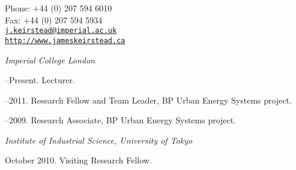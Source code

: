 \documentclass[11pt,a4paper]{article}
\makeatletter
\def\myemail{j.keirstead@imperial.ac.uk}
\def\myweb{http://www.jameskeirstead.ca}
\def\myphone{+44 (0) 207 594 6010}
\def\myfax{+44 (0) 207 594 5934}
\makeatother
\begin{document}
\begin{minipage}[t]{2.95in}
\end{minipage}
\hfill     
\hfill
\begin{minipage}[t]{1.7in}
  \flushright \footnotesize Phone: \myphone \\ 
  Fax: \myfax  \\ 
  {\scriptsize  \texttt{\href{mailto:\myemail}{\myemail}}} \\
  {\scriptsize  \texttt{\href{\myweb}{\myweb}}}
\end{minipage}


\bigskip

\bigskip

\reversemarginpar
\raggedright

\bigskip

\bigskip


\noindent{}%
%
\emph{Imperial College London \vspace{0.01in}}

--Present. Lecturer.      

--2011. Research Fellow and Team Leader, BP Urban Energy Systems project.

--2009. Research Associate, BP Urban Energy Systems project. \vspace{0.02in}

\medskip

\emph{Institute of Industrial Science, University of Tokyo \vspace{0.01in}}

\ind October 2010.  Visiting Research Fellow.

\bigskip

\end{document}
